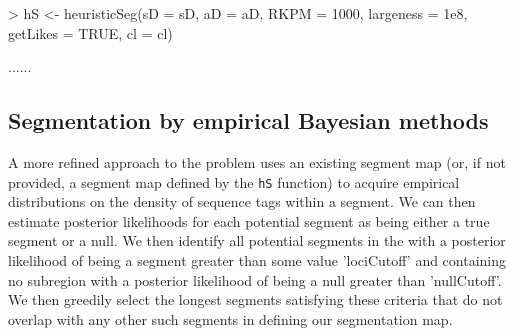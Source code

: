 \documentclass[a4paper]{article}
\begin{document}
\begin{Schunk}
\begin{Sinput}
> hS <- heuristicSeg(sD = sD, aD = aD, RKPM = 1000, largeness = 1e8, getLikes = TRUE, cl = cl)
\end{Sinput}
\begin{Soutput}
......
\end{Soutput}
\end{Schunk}


\subsection*{Segmentation by empirical Bayesian methods}

A more refined approach to the problem uses an existing segment map (or, if not provided, a segment map defined by the \verb'hS' function) to acquire empirical distributions on the density of sequence tags within a segment. We can then estimate posterior likelihoods for each potential segment as being either a true segment or a null. We then identify all
potential segments in the with a posterior likelihood of being a segment
greater than some value 'lociCutoff' and containing no subregion with a posterior
likelihood of being a null greater than 'nullCutoff'. We then greedily
select the longest segments satisfying these criteria that do not
overlap with any other such segments in defining our segmentation map.
\end{document}
